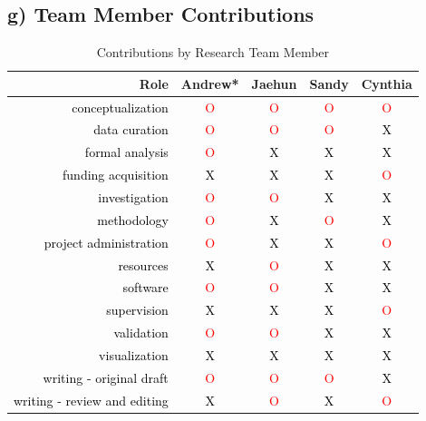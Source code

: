 \documentclass[
  letterpaper,
  DIV=11,
  numbers=noendperiod]{scrartcl}
\begin{document}
\hypertarget{sec-contributions}{%
\subsection{g) Team Member Contributions}\label{sec-contributions}}

\hypertarget{tbl-3}{}
\begin{threeparttable}
\begin{table}
\caption{\label{tbl-3}Contributions by Research Team Member }\tabularnewline

\centering
\begin{tabular}{r|c|c|c|c}
\hline
Role & Andrew* & Jaehun & Sandy & Cynthia\\
\hline
\textcolor{black}{conceptualization} & \textcolor{red}{O} & \textcolor{red}{O} & \textcolor{red}{O} & \textcolor{red}{O}\\
\hline
\textcolor{black}{data curation} & \textcolor{red}{O} & \textcolor{red}{O} & \textcolor{red}{O} & \textcolor{black}{X}\\
\hline
\textcolor{black}{formal analysis} & \textcolor{red}{O} & \textcolor{black}{X} & \textcolor{black}{X} & \textcolor{black}{X}\\
\hline
\textcolor{black}{funding acquisition} & \textcolor{black}{X} & \textcolor{black}{X} & \textcolor{black}{X} & \textcolor{red}{O}\\
\hline
\textcolor{black}{investigation} & \textcolor{red}{O} & \textcolor{red}{O} & \textcolor{black}{X} & \textcolor{black}{X}\\
\hline
\textcolor{black}{methodology} & \textcolor{red}{O} & \textcolor{black}{X} & \textcolor{red}{O} & \textcolor{black}{X}\\
\hline
\textcolor{black}{project administration} & \textcolor{red}{O} & \textcolor{black}{X} & \textcolor{black}{X} & \textcolor{red}{O}\\
\hline
\textcolor{black}{resources} & \textcolor{black}{X} & \textcolor{red}{O} & \textcolor{black}{X} & \textcolor{black}{X}\\
\hline
\textcolor{black}{software} & \textcolor{red}{O} & \textcolor{red}{O} & \textcolor{black}{X} & \textcolor{black}{X}\\
\hline
\textcolor{black}{supervision} & \textcolor{black}{X} & \textcolor{black}{X} & \textcolor{black}{X} & \textcolor{red}{O}\\
\hline
\textcolor{black}{validation} & \textcolor{red}{O} & \textcolor{red}{O} & \textcolor{black}{X} & \textcolor{black}{X}\\
\hline
\textcolor{black}{visualization} & \textcolor{black}{X} & \textcolor{black}{X} & \textcolor{black}{X} & \textcolor{black}{X}\\
\hline
\textcolor{black}{writing - original draft} & \textcolor{red}{O} & \textcolor{red}{O} & \textcolor{red}{O} & \textcolor{black}{X}\\
\hline
\textcolor{black}{writing - review and editing} & \textcolor{black}{X} & \textcolor{red}{O} & \textcolor{black}{X} & \textcolor{red}{O}\\
\hline
\end{tabular}
\end{table}


\end{threeparttable}
\end{document}
